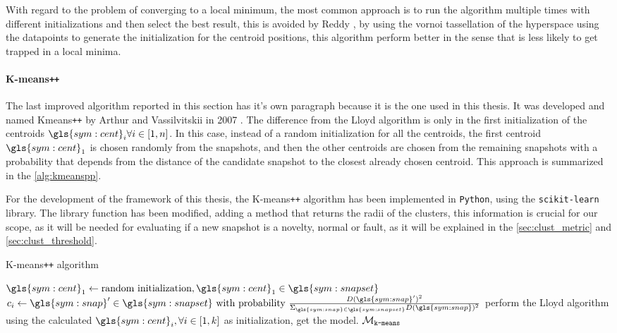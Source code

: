 With regard to the problem of converging to a local minimum, the most common approach is to run the algorithm multiple times with different initializations and then select the best result, this is avoided by Reddy \cite{Vornoi_Kmeans}, by using the vornoi tassellation of the hyperspace using the datapoints to generate the initialization for the centroid positions, this algorithm perform better in the sense that is less likely to get trapped in a local minima.


\paragraph{K-means\texttt{++}} 
The last improved algorithm reported in this section has it's own paragraph because it is the one used in this thesis. It was developed and named Kmeans\texttt{++} by Arthur and Vassilvitskii in 2007 \cite{Kmeanspp}. The difference from the Lloyd algorithm is only in the first initialization of the centroids $\gls{sym:cent}_i \forall i \in [1,n]$. In this case, instead of a random initialization for all the centroids, the first centroid $\gls{sym:cent}_1$ is chosen randomly from the snapshots, and then the other centroids are chosen from the remaining snapshots with a probability that depends from the distance of the candidate snapshot to the closest already chosen centroid. This approach is summarized in the \autoref{alg:kmeanspp}.

For the development of the framework of this thesis, the K-means\texttt{++} algorithm has been implemented in \texttt{Python}, using the \texttt{scikit-learn} library. The library function has been modified, adding a method that returns the radii of the clusters, this information is crucial for our scope, as it will be needed for evaluating if a new snapshot is a novelty, normal or fault, as it will be explained in the \autoref{sec:clust_metric} and \autoref{sec:clust_threshold}.

\begin{algorithm}
  \caption{K-means\texttt{++} algorithm}
  \label{alg:kmeanspp}
\begin{algorithmic}[1]
  \State $\gls{sym:cent}_1 \gets \text{random initialization}, \gls{sym:cent}_1 \in \gls{sym:snapset}$
  \State $c_i \gets \gls{sym:snap}' \in \gls{sym:snapset} \text{ with probability } \frac{D(\gls{sym:snap}')^2}{\Sigma_{\gls{sym:snap}\in\gls{sym:snapset}}D(\gls{sym:snap})^2}$
  \EndFor
  \State perform the Lloyd algorithm using the calculated $\gls{sym:cent}_i, \forall i \in [1,k]$ as initialization, get the model.
  \State \Return $\mathcal{M}_{\text{\texttt{k-means}}}$  
  \EndFunction
\end{algorithmic}
\end{algorithm}

